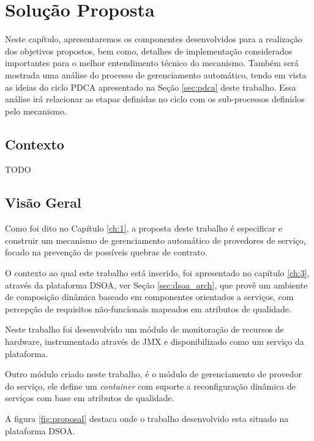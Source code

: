 \chapter{Solução Proposta}
\label{ch:4}

Neste capítulo, apresentaremos os componentes desenvolvidos para a realização dos objetivos propostos, bem como, detalhes de implementação considerados importantes para o melhor entendimento técnico do mecanismo. Também será mostrada uma análise do processo de gerenciamento automático, tendo em vista as ideias do ciclo PDCA apresentado na Seção \ref{sec:pdca} deste trabalho. Essa análise irá relacionar as etapas definidas no ciclo com os sub-processos definidos pelo mecanismo.

\section{Contexto}
TODO

\section{Visão Geral}
Como foi dito no Capítulo \ref{ch:1}, a proposta deste trabalho é especificar e construir um mecanismo de gerenciamento automático de provedores de serviço, focado na prevenção de possíveis quebras de contrato.

O contexto ao qual este trabalho está inserido, foi apresentado no capítulo \ref{ch:3}, através da plataforma DSOA, ver Seção \ref{sec:dsoa_arch}, que provê um ambiente de composição dinâmica baseado em componentes orientados a serviços, com percepção de requisitos não-funcionais mapeados em atributos de qualidade.

Neste trabalho foi desenvolvido um módulo de monitoração de recursos de hardware, instrumentado através de JMX e disponibilizado como um serviço da plataforma. 

Outro módulo criado neste trabalho, é o módulo de gerenciamento de provedor do serviço, ele define um \textit{container} com suporte a reconfiguração dinâmica de serviços com base em atributos de qualidade.

A figura \ref{fig:proposal} destaca onde o trabalho desenvolvido esta situado na plataforma DSOA.

